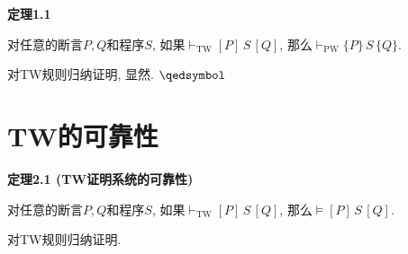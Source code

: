 \documentclass[UTF8]{ctexart}
\begin{document}
\vspace{15pt}

\hypertarget{sec:定理1.1}{}
\noindent\textbf{定理1.1}

对任意的断言$P,Q$和程序$S$, 如果$\vdash_{\mathrm{TW}}[P]\,S\,[Q]$,
那么$\vdash_{\mathrm{PW}}\{P\}\,S\,\{Q\}$.


对TW规则归纳证明, 显然. \hfill $\qedsymbol$





\newpage

\section{TW的可靠性}

\hypertarget{sec:定理2.1}{}
\noindent\textbf{定理2.1 (TW证明系统的可靠性)}

对任意的断言$P,Q$和程序$S$, 如果$\vdash_{\mathrm{TW}}[P]\,S\,[Q]$,
那么$\models[P]\,S\,[Q]$.


对TW规则归纳证明.
\end{document}
